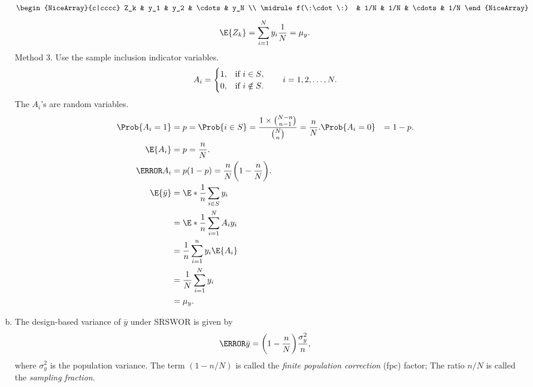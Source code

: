 \documentclass[oneside]{book}\usepackage[]{graphicx}\usepackage[svgnames]{xcolor}
\begin{document}
\begin{enumerate}[(a)]
\[\begin{NiceArray}{c|cccc}
                        Z_k          & y_1 & y_2 & \cdots & y_N \\
                        \midrule
                        f(\:\cdot\:) & 1/N & 1/N & \cdots & 1/N
                  \end{NiceArray} \]
            \[ \E{Z_k}=\sum_{i=1}^{N}y_i \frac{1}{N}=\mu_y. \]
            Method 3. Use the sample inclusion indicator variables.
            \[ A_i=\begin{cases}
                        1, & \text{if $ i\in S $},    \\
                        0, & \text{if $ i\notin S $}.
                  \end{cases}\qquad i=1,2,\ldots,N. \]
            The $ A_i $'s are random variables.
            \begin{align*}
                  \Prob{A_i=1} & =p=\Prob{i\in S}=\frac{1\times \binom{N-n}{n-1}}{\binom{N}{n}}=\frac{n}{N}.
                  \Prob{A_i=0} & =1-p.                                                                       \\
                  \E{A_i}      & =p=\frac{n}{N}.                                                             \\
                  \V{A_i}      & =p(1-p)=\frac{n}{N}\biggl(1-\frac{n}{N}\biggr).                             \\
                  \E{\bar{y}}  & =\E*{\frac{1}{n}\sum_{i\in S}y_i}                                           \\
                               & =\E*{\frac{1}{n}\sum_{i=1}^{N}A_i y_i}                                      \\
                               & =\frac{1}{n}\sum_{i=1}^{n}y_i\E{A_i}                                        \\
                               & =\frac{1}{N}\sum_{i=1}^{N}y_i                                               \\
                               & =\mu_y.
            \end{align*}

      \item The design-based variance of $ \bar{y} $
            under SRSWOR is given by
            \[ \V{\bar{y}}=\biggl(1-\frac{n}{N}\biggr)\frac{\sigma_y^2}{n}, \]
            where $ \sigma_y^2 $ is the population variance. The term
            $ (1-n/N) $ is called the \emph{finite population correction} (fpc)
            factor; The ratio $ n/N $ is called the \emph{sampling fraction}.


\end{enumerate}
\end{document}
